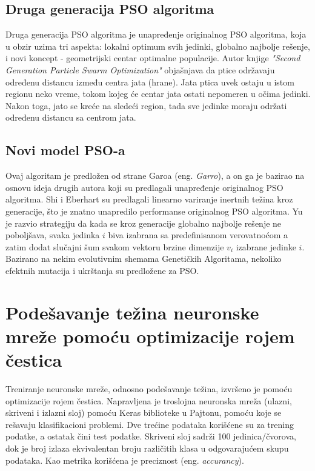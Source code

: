 \documentclass[a4paper]{article}
\begin{document}
{%


\subsection{Druga generacija PSO algoritma}
\label{subsec:sgpso}
Druga generacija PSO algoritma je unapređenje originalnog PSO algoritma, koja u obzir uzima tri aspekta: lokalni optimum svih jedinki,
globalno najbolje rešenje, i novi koncept - geometrijski centar optimalne populacije. Autor knjige \textit{"{}Second Generation Particle Swarm Optimization"} objašnjava da ptice održavaju 
određenu distancu između centra jata (hrane). Jata ptica uvek ostaju u istom regionu neko vreme, tokom kojeg će centar jata ostati
nepomeren u očima jedinki. Nakon toga, jato se kreće na sledeći region, tada sve jedinke moraju održati određenu distancu sa centrom jata.

\subsection{Novi model PSO-a}
\label{subsec:nmpso}
Ovaj algoritam je predložen od strane Garoa (eng. \textit{Garro}), a on ga je bazirao na osnovu ideja drugih autora koji su predlagali unapređenje
originalnog PSO algoritma. 
Shi i Eberhart su predlagali linearno variranje inertnih težina kroz generacije, što je znatno unapredilo performanse originalnog PSO algoritma.
Yu je razvio strategiju da kada se kroz generacije globalno najbolje rešenje ne poboljšava, svaka jedinka \textit{$i$} biva izabrana sa predefinisanom
verovatnoćom a zatim dodat slučajni šum svakom vektoru brzine dimenzije $v_i$ izabrane jedinke \textit{$i$}.
Bazirano na nekim evolutivnim shemama Genetičkih Algoritama, nekoliko efektnih mutacija i ukrštanja su predložene za PSO.

\section{Podešavanje težina neuronske mreže pomoću optimizacije rojem čestica}
\label{sec:podesavanjetezina}

Treniranje neuronske mreže, odnosno podešavanje težina, izvršeno je pomoću optimizacije rojem čestica. 
Napravljena je troslojna neuronska mreža (ulazni, skriveni i izlazni sloj) pomoću Keras biblioteke u Pajtonu, pomoću koje se rešavaju klasifikacioni problemi. Dve trećine podataka korišćene su za trening podatke, a ostatak čini test podatke. Skriveni sloj sadrži 100 jedinica/čvorova, dok je broj izlaza ekvivalentan broju različitih klasa u odgovarajućem skupu podataka. Kao metrika korišćena je preciznost (eng. \emph{accurancy}). 

}
\end{document}
